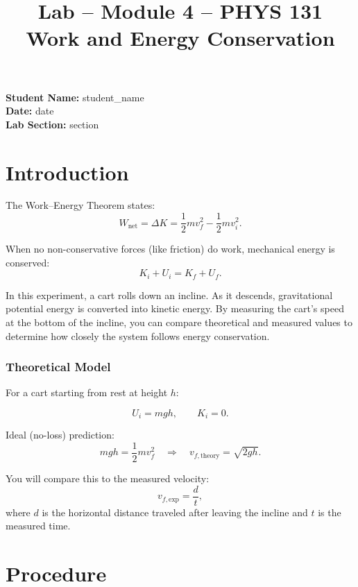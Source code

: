 \documentclass[12pt]{article}
\begin{document}
\title{Lab -- Module 4 -- PHYS 131\\[0.5em]Work and Energy Conservation}
\date{}
\maketitle

\textbf{Student Name:} {{ student_name }}\\
\textbf{Date:} {{ date }}\\
\textbf{Lab Section:} {{ section }}\\[1em]

\section*{Introduction}

The Work–Energy Theorem states:
\[
W_{\text{net}} = \Delta K = \frac{1}{2} m v_f^2 - \frac{1}{2} m v_i^2.
\]

When no non-conservative forces (like friction) do work, mechanical energy is conserved:
\[
K_i + U_i = K_f + U_f.
\]

In this experiment, a cart rolls down an incline. As it descends, gravitational potential energy is converted into kinetic energy. By measuring the cart’s speed at the bottom of the incline, you can compare theoretical and measured values to determine how closely the system follows energy conservation.

\subsubsection*{Theoretical Model}

For a cart starting from rest at height $h$:

\[
U_i = mgh, \qquad K_i = 0.
\]

Ideal (no-loss) prediction:
\[
mgh = \frac{1}{2}mv_f^2 \quad \Rightarrow \quad v_{f,\text{theory}} = \sqrt{2gh}.
\]

You will compare this to the measured velocity:
\[
v_{f,\text{exp}} = \frac{d}{t},
\]
where $d$ is the horizontal distance traveled after leaving the incline and $t$ is the measured time.

\section*{Procedure}
\end{document}
